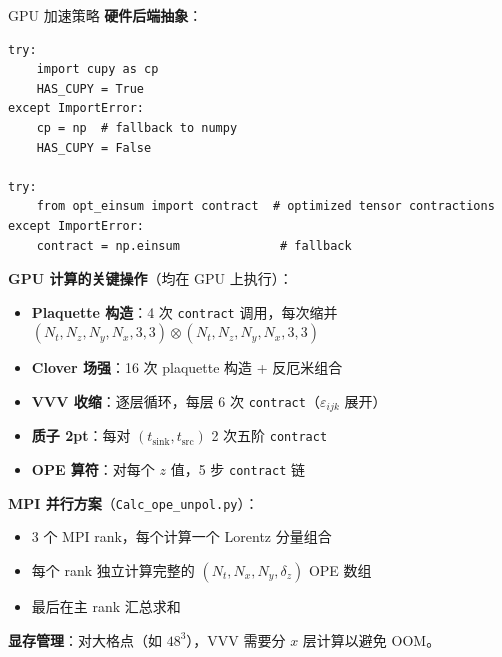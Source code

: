 \documentclass[10pt,aspectratio=169]{beamer}
\begin{document}
\begin{frame}[fragile]{GPU 加速策略}
\small
\textbf{硬件后端抽象}：
\begin{lstlisting}
try:
    import cupy as cp
    HAS_CUPY = True
except ImportError:
    cp = np  # fallback to numpy
    HAS_CUPY = False

try:
    from opt_einsum import contract  # optimized tensor contractions
except ImportError:
    contract = np.einsum              # fallback
\end{lstlisting}

\textbf{GPU 计算的关键操作}（均在 GPU 上执行）：
\begin{itemize}
  \item \textbf{Plaquette 构造}：4 次 \texttt{contract} 调用，每次缩并 $(N_t,N_z,N_y,N_x,3,3) \otimes (N_t,N_z,N_y,N_x,3,3)$
  \item \textbf{Clover 场强}：16 次 plaquette 构造 + 反厄米组合
  \item \textbf{VVV 收缩}：逐层循环，每层 6 次 \texttt{contract}（$\varepsilon_{ijk}$ 展开）
  \item \textbf{质子 2pt}：每对 $(t_{\text{sink}}, t_{\text{src}})$ 2 次五阶 \texttt{contract}
  \item \textbf{OPE 算符}：对每个 $z$ 值，5 步 \texttt{contract} 链
\end{itemize}

\textbf{MPI 并行方案}（\texttt{Calc\_ope\_unpol.py}）：
\begin{itemize}
  \item 3 个 MPI rank，每个计算一个 Lorentz 分量组合
  \item 每个 rank 独立计算完整的 $(N_t, N_x, N_y, \delta_z)$ OPE 数组
  \item 最后在主 rank 汇总求和
\end{itemize}

\textbf{显存管理}：对大格点（如 $48^3$），VVV 需要分 $x$ 层计算以避免 OOM。
\end{frame}
\end{document}
